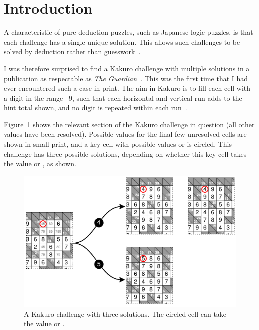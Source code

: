\documentclass{gapd}
\begin{document}
\maketitle

\section{Introduction}
\label{sec:Introduction}

\lettrine{A}{} characteristic of pure deduction puzzles,
such as Japanese logic puzzles, is that each challenge has a single
unique solution.  This allows such challenges to be solved by
deduction rather than guesswork~\cite{browne}.

I was therefore surprised to find a Kakuro challenge with multiple
solutions in a publication as respectable as \textit{The
  Guardian}~\cite{guardian}.  This was the first time that I had ever
encountered such a case in print.  The aim in Kakuro is to fill each
cell with a digit in the range {--9}, such that each horizontal
and vertical run adds to the hint total shown, and no digit is
repeated within each run~\cite{nikoli}.

Figure~\ref{fig:Kakuro} shows the relevant section of the Kakuro
challenge in question (all other values have been resolved).  Possible
values for the final few unresolved cells are shown in small print,
and a key cell with possible values {} or {} is circled.
This challenge has three possible solutions, depending on whether this
key cell takes the value {} or {}, as shown.

\begin{figure}[!thb]
  \centering
  \includegraphics[width=\linewidth]{graphics/kakuro-1372-multiple-1.pdf}
  \caption{A Kakuro challenge with three solutions. The circled cell
    can take the value {} or {}.}
  \label{fig:Kakuro}
\end{figure}
\end{document}
